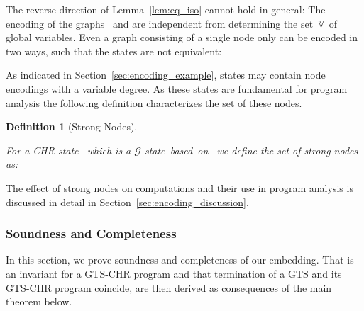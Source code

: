\documentclass{tlp}
\newtheorem{definition}{Definition}[section]
\newcommand{\mcG}{\ensuremath{\mathcal{G}}}
\newcommand{\bbV}{\ensuremath{\mathbb{V}}}
\begin{document}
The reverse direction of Lemma~\ref{lem:eq_iso} cannot hold in general:
The encoding of the graphs~ and  are independent from determining the
set~\bbV\ of global variables. Even a graph consisting of a single node only can
be encoded in two ways, such that the states are not equivalent:


As indicated in Section~\ref{sec:encoding_example}, states may contain node
encodings with a variable degree. As these states are fundamental for program
analysis the following definition characterizes the set of these nodes.

\begin{definition}[Strong Nodes]\label{def:strong_state}

For a CHR state~ which is a
\mcG-state~based~on~ we define the set of \emph{strong nodes} as: 
\end{definition}

The effect of strong nodes on computations and their use in program analysis is
discussed in detail in Section~\ref{sec:encoding_discussion}.

\subsubsection{Soundness and Completeness}
\label{sec:sound_complete}

In this section, we prove soundness and completeness of our embedding. That
 is an invariant for a GTS-CHR program and that termination of a GTS and
its GTS-CHR program coincide, are then derived as consequences of the main
theorem below.
\end{document}
